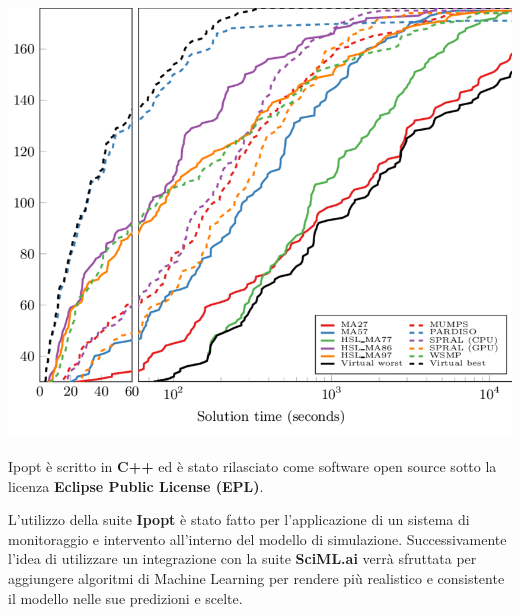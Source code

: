 \begin{minipage}{\linewidth}
    \centering
    \includegraphics[width=\textwidth]{img/Comparison-of-Ipopt-performance-over-various-linear-solvers-using-the-two-dimensional.png}
    \label{fig:Ipopt_solver}
\end{minipage}

Ipopt è scritto in \textbf{C++} ed è stato rilasciato come software open source sotto la licenza \textbf{Eclipse Public License (EPL)}.

L'utilizzo della suite \textbf{Ipopt} è stato fatto per l'applicazione di un sistema
di monitoraggio e intervento all'interno del modello di simulazione. Successivamente l'idea
di utilizzare un integrazione con la suite \textbf{SciML.ai} verrà sfruttata per 
aggiungere algoritmi di Machine Learning per rendere più realistico e consistente il modello 
nelle sue predizioni e scelte.

